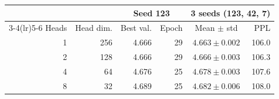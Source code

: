 \begin{tabular}{rrrrcr}
\toprule
& & \multicolumn{2}{c}{Seed 123} & \multicolumn{2}{c}{3 seeds (123, 42, 7)} \\
\cmidrule(lr){3-4}\cmidrule(lr){5-6}
Heads & Head dim. & Best val. & Epoch & Mean $\pm$ std & PPL \\
\midrule
1 & 256 & 4.666 & 29 & $4.663 \pm 0.002$ & 106.0 \\
2 & 128 & 4.666 & 29 & $4.666 \pm 0.003$ & 106.3 \\
4 & 64 & 4.676 & 25 & $4.678 \pm 0.003$ & 107.6 \\
8 & 32 & 4.689 & 25 & $4.682 \pm 0.006$ & 108.0 \\
\bottomrule
\end{tabular}
